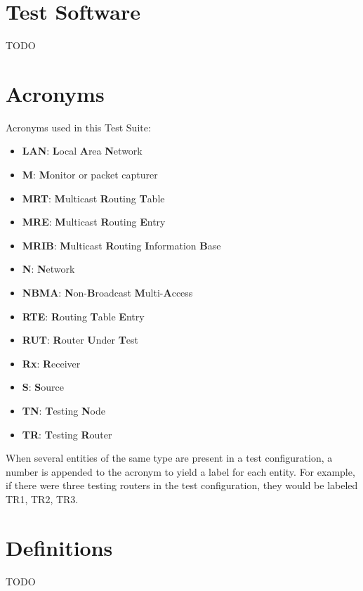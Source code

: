 \documentclass[11pt]{report}
\begin{document}
\section{Test Software}

TODO

\section{Acronyms}

Acronyms used in this Test Suite:

\begin{itemize}
  \item {\bf LAN}: {\bf L}ocal {\bf A}rea {\bf N}etwork
  \item {\bf M}: {\bf M}onitor or packet capturer
  \item {\bf MRT}: {\bf M}ulticast {\bf R}outing {\bf T}able
  \item {\bf MRE}: {\bf M}ulticast {\bf R}outing {\bf E}ntry
  \item {\bf MRIB}: {\bf M}ulticast {\bf R}outing {\bf I}nformation {\bf B}ase
  \item {\bf N}: {\bf N}etwork
  \item {\bf NBMA}: {\bf N}on-{\bf B}roadcast {\bf M}ulti-{\bf A}ccess
  \item {\bf RTE}: {\bf R}outing {\bf T}able {\bf E}ntry
  \item {\bf RUT}: {\bf R}outer {\bf U}nder {\bf T}est
  \item {\bf Rx}: {\bf R}eceiver
  \item {\bf S}: {\bf S}ource
  \item {\bf TN}: {\bf T}esting {\bf N}ode
  \item {\bf TR}: {\bf T}esting {\bf R}outer
\end{itemize}

When several entities of the same type are present in a test configuration, a
number is appended to the acronym to yield a label for each entity. For
example, if there were three testing routers in the test configuration, they
would be labeled TR1, TR2, TR3.

\section{Definitions}

TODO
\end{document}
